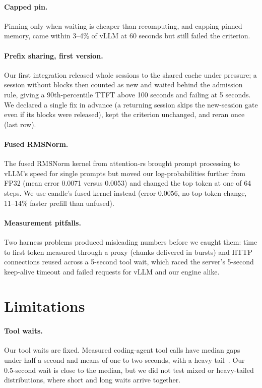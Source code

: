 \documentclass[11pt]{article}
\begin{document}
\paragraph{Capped pin.} Pinning only when waiting is cheaper than recomputing, and capping pinned memory, came within 3--4\% of vLLM at 60 seconds but still failed the criterion.

\paragraph{Prefix sharing, first version.} Our first integration released whole sessions to the shared cache under pressure; a session without blocks then counted as new and waited behind the admission rule, giving a 90th-percentile TTFT above 100 seconds and failing at 5 seconds. We declared a single fix in advance (a returning session skips the new-session gate even if its blocks were released), kept the criterion unchanged, and reran once (last row).

\paragraph{Fused RMSNorm.} The fused RMSNorm kernel from attention-rs brought prompt processing to vLLM's speed for single prompts but moved our log-probabilities further from FP32 (mean error 0.0071 versus 0.0053) and changed the top token at one of 64 steps. We use candle's fused kernel instead (error 0.0056, no top-token change, 11--14\% faster prefill than unfused).

\paragraph{Measurement pitfalls.} Two harness problems produced misleading numbers before we caught them: time to first token measured through a proxy (chunks delivered in bursts) and HTTP connections reused across a 5-second tool wait, which raced the server's 5-second keep-alive timeout and failed requests for vLLM and our engine alike.

\section{Limitations}

\paragraph{Tool waits.} Our tool waits are fixed. Measured coding-agent tool calls have median gaps under half a second and means of one to two seconds, with a heavy tail~\cite{cachetrap,workloadchar,continuum}. Our 0.5-second wait is close to the median, but we did not test mixed or heavy-tailed distributions, where short and long waits arrive together.
\end{document}
